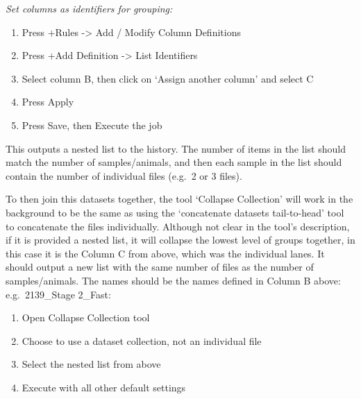 \documentclass[
]{book}
\providecommand{\tightlist}{%
  \setlength{\itemsep}{0pt}\setlength{\parskip}{0pt}}
\begin{document}
\emph{Set columns as identifiers for grouping:}

\begin{enumerate}
\def\labelenumi{\arabic{enumi}.}
\setcounter{enumi}{9}
\tightlist
\item
  Press +Rules -\textgreater{} Add / Modify Column Definitions
\item
  Press +Add Definition -\textgreater{} List Identifiers
\item
  Select column B, then click on `Assign another column' and select C
\item
  Press Apply
\item
  Press Save, then Execute the job
\end{enumerate}

This outputs a nested list to the history. The number of items in the list should match the number of samples/animals, and then each sample in the list should contain the number of individual files (e.g.~2 or 3 files).

To then join this datasets together, the tool `Collapse Collection' will work in the background to be the same as using the `concatenate datasets tail-to-head' tool to concatenate the files individually. Although not clear in the tool's description, if it is provided a nested list, it will collapse the lowest level of groups together, in this case it is the Column C from above, which was the individual lanes. It should output a new list with the same number of files as the number of samples/animals. The names should be the names defined in Column B above: e.g.~2139\_Stage 2\_Fast:

\begin{enumerate}
\def\labelenumi{\arabic{enumi}.}
\tightlist
\item
  Open Collapse Collection tool
\item
  Choose to use a dataset collection, not an individual file
\item
  Select the nested list from above
\item
  Execute with all other default settings
\end{enumerate}
\end{document}
